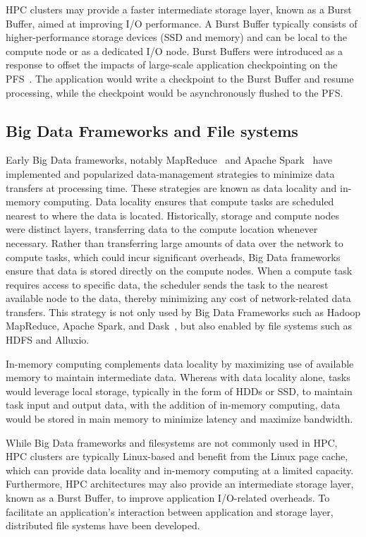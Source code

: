 \documentclass[10pt,journal,compsoc]{IEEEtran}
\begin{document}
      
      HPC clusters may provide a faster intermediate storage layer, known as a
      Burst Buffer, aimed at improving I/O performance. A Burst Buffer typically
      consists of higher-performance storage devices (SSD and memory) and can be
      local to the compute node or as a dedicated I/O node. Burst Buffers were
      introduced as a response to offset the impacts of large-scale application
      checkpointing on the PFS~\cite{bb}. The application would write a
      checkpoint to the Burst Buffer and resume processing, while the checkpoint
      would be asynchronously flushed to the PFS. 


\subsection{Big Data Frameworks and File systems}

Early Big Data
      frameworks, notably MapReduce~\cite{dean2008mapreduce} and Apache
      Spark~\cite{zaharia2016apache} have implemented and popularized
      data-management strategies to minimize data transfers at processing time.
      These strategies are known as data locality and in-memory computing.
      Data locality ensures that compute tasks are scheduled nearest to where
      the data is located. Historically, storage and compute nodes were distinct
      layers, transferring data to the compute location whenever necessary. Rather than transferring
      large amounts of data over the network to compute tasks, which could incur
      significant overheads, Big Data frameworks ensure that data is stored
      directly on the compute nodes. When a compute task requires access to
      specific data, the scheduler sends the task to the nearest available node
      to the data, thereby minimizing any cost of network-related data
      transfers. This strategy is not only used by Big Data Frameworks such as
      Hadoop MapReduce, Apache Spark, and Dask~\cite{rocklin2015dask}, but also
      enabled by file systems such as HDFS and Alluxio.

      In-memory computing complements data locality by maximizing use of
      available memory to maintain intermediate data. Whereas with data locality
      alone, tasks would leverage local storage, typically in the form of HDDs
      or SSD, to maintain task input and output data, with the addition of
      in-memory computing, data would be stored in main memory to minimize
      latency and maximize bandwidth.

      While Big Data frameworks and filesystems are not commonly used in HPC,
      HPC clusters are typically Linux-based and benefit from the Linux page
      cache, which can provide data locality and in-memory computing at a
      limited capacity. Furthermore, HPC architectures may also provide an
      intermediate storage layer, known as a Burst Buffer, to improve
      application I/O-related overheads. To facilitate an application's
      interaction between application and storage layer, distributed file
      systems have been developed.
\end{document}
